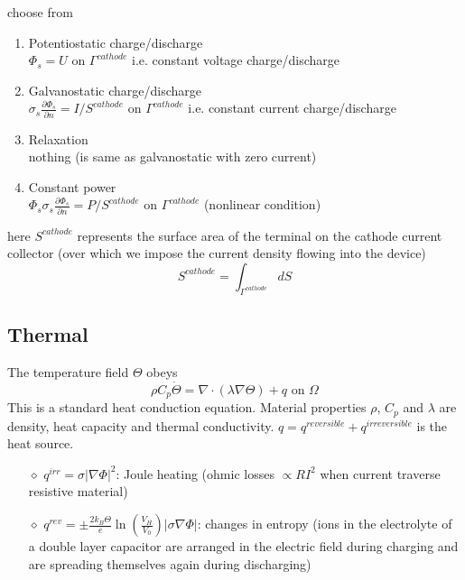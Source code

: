 \documentclass[10pt, oneside]{article}   	%
\begin{document}
choose from
\begin{enumerate}
\item Potentiostatic charge/discharge \\
$\Phi_s = U \text{\ on\ } \Gamma^{cathode}$
i.e. constant voltage charge/discharge

\item Galvanostatic charge/discharge \\
$\sigma_s \frac{\partial \Phi_s}{\partial n} = I / S^{cathode} \text{\ on\ } \Gamma^{cathode}$
i.e. constant current charge/discharge

\item Relaxation \\
nothing (is same as galvanostatic with zero current)

\item Constant power \\
$\Phi_s \sigma_s \frac{\partial \Phi_s}{\partial n} = P / S^{cathode} \text{\ on\ } \Gamma^{cathode}$
(nonlinear condition)
\end{enumerate}

here $S^{cathode}$ represents the surface area of the terminal on the cathode
current collector (over which we impose the current density flowing into the
device)
\begin{equation}
S^{cathode} = \int_{\Gamma^{cathode}} dS
\end{equation}

\subsection{Thermal}

The temperature field $\Theta$ obeys
\begin{equation}
\rho C_p \dot{\Theta} = \nabla \cdot (\lambda \nabla \Theta) + q \text{ on } \Omega
\label{eq:heat_conduction}
\end{equation}
This is a standard heat conduction equation.
Material properties $\rho$, $C_p$ and $\lambda$ are density, heat capacity and
thermal conductivity.
$q=q^{reversible}+q^{irreversible}$ is the heat source.
\begin{itemize}
\item[$\diamond$] $q^{irr} = \sigma | \nabla \Phi |^2$: Joule heating (ohmic
losses $\propto R I^2$ when current traverse resistive material)

\item[$\diamond$] $q^{rev} = \pm \frac{2 k_B \Theta}{e} \ln(\frac{V_H}{V_0}) |
\sigma \nabla \Phi |$: changes in entropy (ions in the electrolyte of a double
layer capacitor are arranged in the electric field during charging and are
spreading themselves again during discharging)
\end{itemize}
\end{document}
